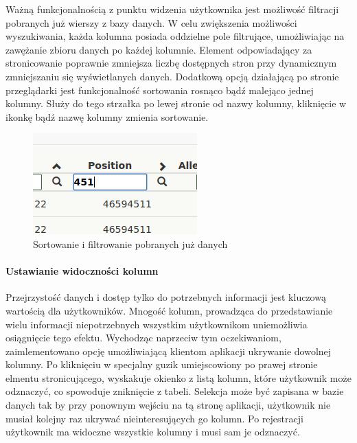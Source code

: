 \documentclass[a4paper,12pt,twoside]{article}
\begin{document}
Ważną funkcjonalnością z punktu widzenia użytkownika jest możliwość filtracji pobranych już wierszy
z bazy danych. W celu zwiększenia możliwości wyszukiwania, każda kolumna posiada oddzielne pole
filtrujące, umożliwiając na zawężanie zbioru danych po każdej kolumnie. Element odpowiadający
za stronicowanie poprawnie zmniejsza liczbę dostępnych stron przy dynamicznym zmniejszaniu się
wyświetlanych danych.
Dodatkową opcją działającą po stronie przeglądarki jest
funkcjonalność sortowania rosnąco bądź malejąco jednej kolumny. Służy do tego strzałka po
lewej stronie od nazwy kolumny, kliknięcie w ikonkę bądź nazwę kolumny zmienia sortowanie.

\begin{figure}[h]
\centering
\includegraphics{obrazy/aplikacja/sortingAndSearch.png}
\caption{Sortowanie i filtrowanie pobranych już danych}
\label{fig:sortingAndSearchpic}
\end{figure}

\newpage
\paragraph{Ustawianie widoczności kolumn}
Przejrzystość danych i dostęp tylko do potrzebnych informacji jest kluczową wartością dla użytkowników.
Mnogość kolumn, prowadząca do przedstawianie wielu informacji niepotrzebnych
wszystkim użytkownikom uniemożliwia osiągnięcie tego efektu. Wychodząc naprzeciw tym oczekiwaniom,
zaimlementowano opcję umożliwiającą klientom aplikacji ukrywanie dowolnej kolumny.
Po kliknięciu w specjalny guzik umiejscowiony po prawej stronie elmentu stronicującego, wyskakuje okienko z listą kolumn,
które użytkownik może odznaczyć, co spowoduje zniknięcie z tabeli. Selekcja może być zapisana
w bazie danych tak by przy ponownym wejściu na tą stronę aplikacji, użytkownik nie musiał
kolejny raz ukrywać nieinteresujących go kolumn. Po rejestracji użytkownik ma widoczne wszystkie
kolumny i musi sam je odznaczyć.
\end{document}
